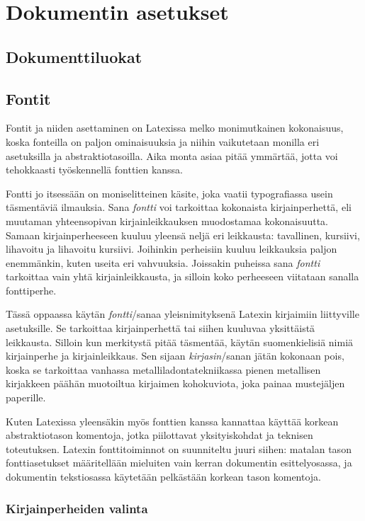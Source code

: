 \chapter{Dokumentin asetukset}
\section{Dokumenttiluokat}
\label{luku:dokumenttiluokat}
\section{Fontit}
\label{luku:kirjaintyypit}

Fontit ja niiden asettaminen on Latexissa melko monimutkainen
kokonaisuus, koska fonteilla on paljon ominaisuuksia ja niihin
vaikutetaan monilla eri asetuksilla ja abstraktiotasoilla. Aika monta
asiaa pitää ymmärtää, jotta voi tehokkaasti työskennellä fonttien
kanssa.

Fontti jo itsessään on moniselitteinen käsite, joka vaatii
typo\-gra\-fias\-sa usein täsmentäviä ilmauksia. Sana \emph{fontti} voi
tarkoittaa kokonaista kirjainperhettä, eli muutaman yhteensopivan
kirjainleikkauksen muodostamaa kokonaisuutta. Samaan kirjainperheeseen
kuuluu yleensä neljä eri leikkausta: tavallinen, kursiivi, lihavoitu ja
lihavoitu kursiivi. Joihinkin perheisiin kuuluu leikkauksia paljon
enemmänkin, kuten useita eri vahvuuksia. Joissakin puheissa sana
\emph{fontti} tarkoittaa vain yhtä kirjainleikkausta, ja silloin koko
perheeseen viitataan sanalla fonttiperhe.

Tässä oppaassa käytän \emph{fontti}\-/sanaa yleisnimityksenä Latexin
kirjaimiin liittyville asetuksille. Se tarkoittaa kirjainperhettä tai
siihen kuuluvaa yksittäistä leikkausta. Silloin kun merkitystä pitää
täsmentää, käytän suomenkielisiä nimiä kirjainperhe ja kirjainleikkaus.
Sen sijaan \emph{kirjasin}\-/sanan jätän kokonaan pois, koska se
tarkoittaa vanhassa metalliladontatekniikassa pienen metallisen
kirjakkeen päähän muotoiltua kirjaimen kohokuviota, joka painaa
mustejäljen paperille.

Kuten Latexissa yleensäkin myös fonttien kanssa kannattaa käyttää
korkean abstraktiotason komentoja, jotka piilottavat yksityiskohdat ja
teknisen toteutuksen. Latexin fonttitoiminnot on suunniteltu juuri
siihen: matalan tason fontti\-asetukset määritellään mieluiten vain
kerran dokumentin esittely\-osassa, ja dokumentin teksti\-osassa
käytetään pelkästään korkean tason komentoja.

\subsection{Kirjainperheiden valinta}


